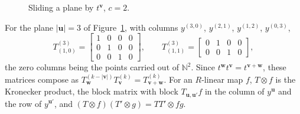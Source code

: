 \documentclass[12pt]{amsart}
\theoremstyle{plain}
\theoremstyle{definition}
\newcommand{\N}{\mathbb{N}}
\begin{document}
\begin{figure}[htbp]
{}
    \caption{Sliding a plane by $t^{\boldsymbol{v}}$, $c = 2$.}
    \label{fig:slide}
\end{figure}

For the plane $|\boldsymbol{u}| = 3$ of Figure~\ref{fig:slide}, with columns $y^{(3,0)}$, $y^{(2,1)}$, $y^{(1,2)}$, $y^{(0,3)}$,
\[
    T^{(3)}_{(1,0)} = \begin{bmatrix} 1 & 0 & 0 & 0\\ 0 & 1 & 0 & 0\\ 0 & 0 & 1 & 0\end{bmatrix}, \qquad
    T^{(3)}_{(1,1)} = \begin{bmatrix} 0 & 1 & 0 & 0\\ 0 & 0 & 1 & 0\end{bmatrix} ,
\]
the zero columns being the points carried out of $\N^2$. Since $t^{\boldsymbol{w}} t^{\boldsymbol{v}} = t^{\boldsymbol{v}+\boldsymbol{w}}$, these matrices compose as $T^{(k-|\boldsymbol{v}|)}_{\boldsymbol{w}} T^{(k)}_{\boldsymbol{v}} = T^{(k)}_{\boldsymbol{v}+\boldsymbol{w}}$. For an $R$-linear map $f$, $T \otimes f$ is the Kronecker product, the block matrix with block $T_{\boldsymbol{u},\boldsymbol{u'}} f$ in the column of $y^{\boldsymbol{u}}$ and the row of $y^{\boldsymbol{u'}}$, and $(T \otimes f)(T' \otimes g) = TT' \otimes fg$.
\end{document}
